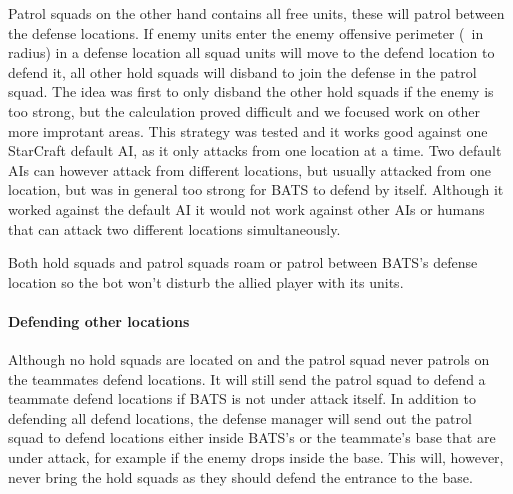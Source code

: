 Patrol squads on the other hand contains all free units, these will patrol between the defense locations. If enemy units enter the enemy offensive perimeter (\squadDefendEnemyOffensivePerimeter~in radius) in a defense location all squad units will move to the defend location to defend it, all other hold squads will disband to join the defense in the patrol squad. The idea was first to only disband the other hold squads if the enemy is too strong, but the calculation proved difficult and we focused work on other more improtant areas. This strategy was tested and it works good against one StarCraft default AI, as it only attacks from one location at a time. Two default AIs can however attack from different locations, but usually attacked from one location, but was in general too strong for BATS to defend by itself. Although it worked against the default AI it would not work against other AIs or humans that can attack two different locations simultaneously.

Both hold squads and patrol squads roam or patrol between BATS’s defense location so the bot won’t disturb the allied player with its units.

\paragraph{Defending other locations}
Although no hold squads are located on and the patrol squad never patrols on the teammates defend locations. It will still send the patrol squad to defend a teammate defend locations if BATS is not under attack itself. In addition to defending all defend locations, the defense manager will send out the patrol squad to defend locations either inside BATS’s or the teammate's base that are under attack, for example if the enemy drops inside the base. This will, however, never bring the hold squads as they should defend the entrance to the base.